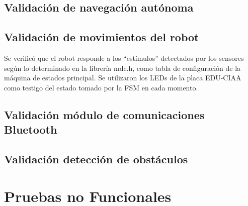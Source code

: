 \subsection{Validación de navegación autónoma}
\subsection{Validación de movimientos del robot}
Se verificó que el robot responde a los “estímulos” detectados por los sensores según lo determinado en la librería mde.h, como tabla de configuración de la máquina de estados principal. 
Se utilizaron los LEDs de la placa EDU-CIAA como testigo del estado tomado por la FSM en cada momento. 

\subsection{Validación módulo de comunicaciones Bluetooth}
\subsection{Validación detección de obstáculos}



\section{Pruebas no Funcionales}
